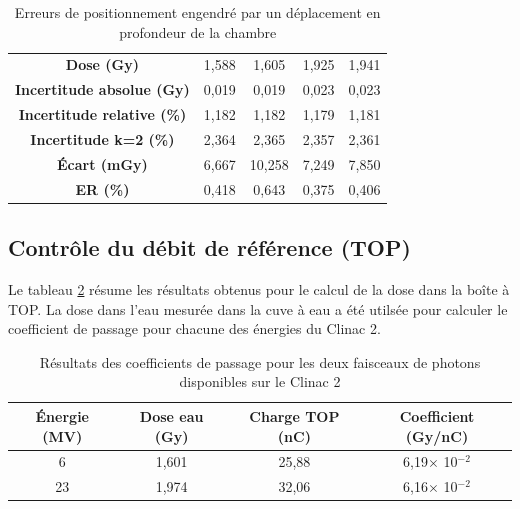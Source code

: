 \documentclass{article}
\begin{document}
\begin{table}[h]
\begin{tabular}{c|cc|cc|}
  \multicolumn{1}{|c|}{\textbf{Dose (Gy)}}                 & 1,588           & 1,605          & 1,925           & 1,941           \\
  \multicolumn{1}{|c|}{\textbf{Incertitude absolue (Gy)}}  & 0,019           & 0,019          & 0,023           & 0,023           \\
  \multicolumn{1}{|c|}{\textbf{Incertitude relative (\%)}} & 1,182           & 1,182          & 1,179           & 1,181           \\
  \multicolumn{1}{|c|}{\textbf{Incertitude k=2 (\%)}}      & 2,364           & 2,365          & 2,357           & 2,361           \\
  \multicolumn{1}{|c|}{\textbf{Écart (mGy)}}               & 6,667           & 10,258         & 7,249           & 7,850           \\
  \multicolumn{1}{|c|}{\textbf{ER (\%)}}                   & 0,418           & 0,643          & 0,375           & 0,406           \\ \hline
  \end{tabular}
  \caption{Erreurs de positionnement engendré par un déplacement en profondeur de la chambre}
  \label{table_erreur_profondeur}
\end{table}

\subsection{Contrôle du débit de référence (TOP)}

Le tableau \ref*{table_coeff_passage} résume les résultats obtenus pour le calcul de la dose dans la boîte à TOP. La dose dans l'eau mesurée dans la cuve à eau a été utilsée pour calculer le coefficient de passage pour chacune des énergies du Clinac 2. 

\begin{table}[h]
  \centering
  \begin{tabular}{cccc}
    \toprule
    \textbf{Énergie (MV)} & \textbf{Dose eau (Gy)} & \textbf{Charge TOP (nC)} & \textbf{Coefficient (Gy/nC)}\\
    \toprule
    6 & 1,601 & 25,88 & 6,19$\times$ 10$^{-2}$ \\
    23 & 1,974 & 32,06 & 6,16$\times$ 10$^{-2}$ \\
    \bottomrule
  \end{tabular}
  \caption{Résultats des coefficients de passage pour les deux faisceaux de photons disponibles sur le Clinac 2}
  \label{table_coeff_passage}
\end{table}

\clearpage


\nocite{*}
\end{document}
